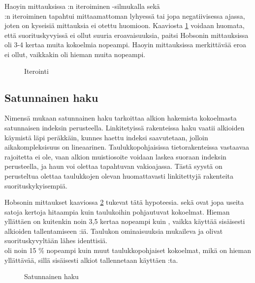 Haoyin mittauksissa\cite{haoyiBenchmark} :n iteroiminen -silmukalla sekä \\:n iteroiminen tapahtui mittaamattoman lyhyessä tai jopa negatiivisessa ajassa, joten on kyseisiä mittauksia ei otettu huomioon. Kaaviosta \ref{iterointi_kaavio} voidaan huomata, että suorituskyvyissä ei ollut suuria eroavaisuuksia, paitsi Hobsonin mittauksissa\cite{hobsonBenchmark}  oli 3-4 kertaa muita kokoelmia nopeampi. Haoyin mittauksissa\cite{haoyiBenchmark} merkittävää eroa ei ollut, vaikkakin  oli hieman muita nopeampi.

\begin{figure}[h]
    \centering
    
    \caption{Iterointi}\label{iterointi_kaavio}
\end{figure}


\subsection{Satunnainen haku}
Nimensä mukaan satunnainen haku tarkoittaa alkion hakemista kokoelmasta satunnaisen indeksin perusteella. Linkitetyissä rakenteissa haku vaatii alkioiden käymistä läpi peräkkäin, kunnes haettu indeksi saavutetaan, jolloin aikakompleksisuus on lineaarinen. Taulukkopohjaisissa tietorakenteissa vastaavaa rajoitetta ei ole, vaan alkion muistiosoite voidaan laskea suoraan indeksin perusteella, ja haun voi olettaa tapahtuvan vakioajassa. Tästä syystä on perusteltua olettaa taulukkojen olevan huomattavasti linkitettyjä rakenteita suorituskykyisempiä.

Hobsonin mittaukset\cite{hobsonBenchmark} kaaviossa \ref{satunnainenHaku_kaavio} tukevat tätä hypoteesia.  sekä  ovat jopa useita satoja kertoja hitaampia kuin taulukoihin pohjautuvat kokoelmat. Hieman yllättäen  on kuitenkin noin 3,5 kertaa nopeampi kuin , vaikka  käyttää sisäisesti alkioiden tallentamiseen :iä. Taulukon ominaisuuksia mukaileva  ja  olivat suorituskyvyltään lähes identtisiä. \\ oli noin 15 \% nopeampi kuin muut taulukkopohjaiset kokoelmat, mikä on hieman yllättävää, sillä sisäisesti alkiot tallennetaan käyttäen :ta.

\begin{figure}[h]
    \centering
    
    \caption{Satunnainen haku}\label{satunnainenHaku_kaavio}
\end{figure}


